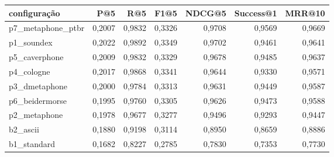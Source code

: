 \begin{tabular}{lrrrrrr}
\hline
configuração & P@5 & R@5 & F1@5 & NDCG@5 & Success@1 & MRR@10 \\
\hline
p7\_metaphone\_ptbr & 0,2007 & 0,9832 & 0,3326 & 0,9708 & 0,9569 & 0,9669 \\
p1\_soundex & 0,2022 & 0,9892 & 0,3349 & 0,9702 & 0,9461 & 0,9641 \\
p5\_caverphone & 0,2009 & 0,9832 & 0,3329 & 0,9678 & 0,9485 & 0,9637 \\
p4\_cologne & 0,2017 & 0,9868 & 0,3341 & 0,9644 & 0,9330 & 0,9571 \\
p3\_dmetaphone & 0,2000 & 0,9784 & 0,3313 & 0,9631 & 0,9449 & 0,9587 \\
p6\_beidermorse & 0,1995 & 0,9760 & 0,3305 & 0,9626 & 0,9473 & 0,9588 \\
p2\_metaphone & 0,1978 & 0,9677 & 0,3277 & 0,9496 & 0,9293 & 0,9447 \\
b2\_ascii & 0,1880 & 0,9198 & 0,3114 & 0,8950 & 0,8659 & 0,8886 \\
b1\_standard & 0,1682 & 0,8227 & 0,2785 & 0,7830 & 0,7353 & 0,7730 \\
\hline
\end{tabular}